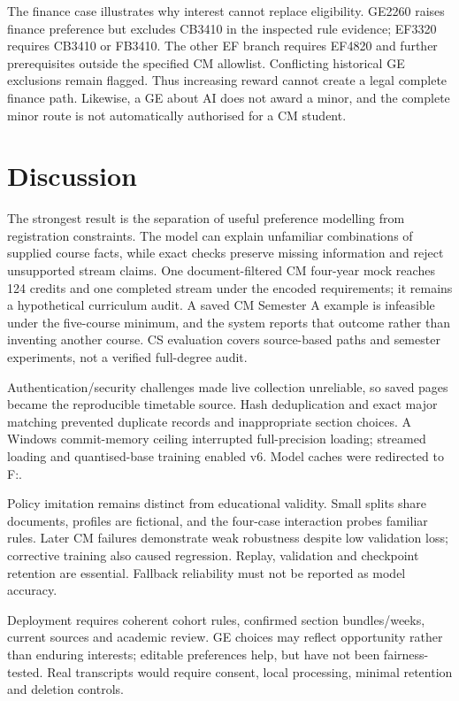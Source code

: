 \documentclass{article}
\begin{document}
The finance case illustrates why interest cannot replace eligibility. GE2260 raises finance preference but excludes CB3410 in the inspected rule evidence; EF3320 requires CB3410 or FB3410. The other EF branch requires EF4820 and further prerequisites outside the specified CM allowlist. Conflicting historical GE exclusions remain flagged\citep{cityu-finance}. Thus increasing reward cannot create a legal complete finance path. Likewise, a GE about AI does not award a minor, and the complete minor route is not automatically authorised for a CM student.

\newpage
\section{Discussion}
The strongest result is the separation of useful preference modelling from registration constraints. The model can explain unfamiliar combinations of supplied course facts, while exact checks preserve missing information and reject unsupported stream claims. One document-filtered CM four-year mock reaches 124 credits and one completed stream under the encoded requirements; it remains a hypothetical curriculum audit. A saved CM Semester A example is infeasible under the five-course minimum, and the system reports that outcome rather than inventing another course. CS evaluation covers source-based paths and semester experiments, not a verified full-degree audit.

Authentication/security challenges made live collection unreliable, so saved pages became the reproducible timetable source. Hash deduplication and exact major matching prevented duplicate records and inappropriate section choices. A Windows commit-memory ceiling interrupted full-precision loading; streamed loading and quantised-base training enabled v6. Model caches were redirected to F:.

Policy imitation remains distinct from educational validity. Small splits share documents, profiles are fictional, and the four-case interaction probes familiar rules. Later CM failures demonstrate weak robustness despite low validation loss; corrective training also caused regression. Replay, validation and checkpoint retention are essential. Fallback reliability must not be reported as model accuracy.

Deployment requires coherent cohort rules, confirmed section bundles/weeks, current sources and academic review. GE choices may reflect opportunity rather than enduring interests; editable preferences help, but have not been fairness-tested. Real transcripts would require consent, local processing, minimal retention and deletion controls.
\end{document}
